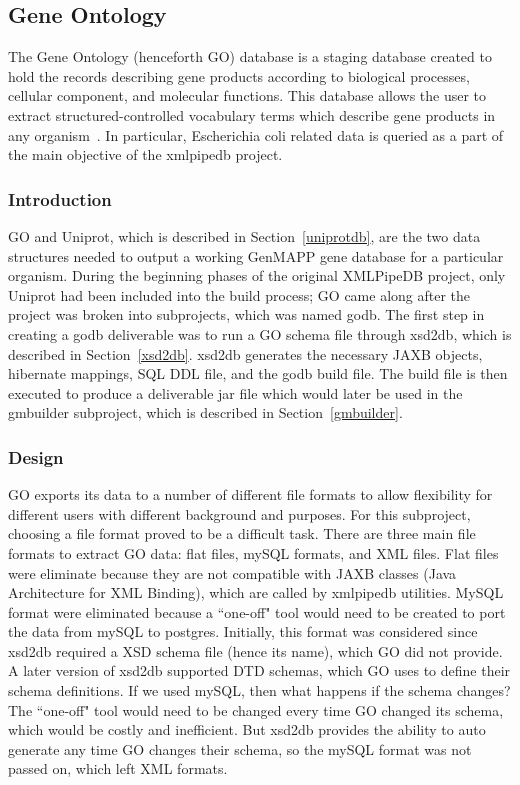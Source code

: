 %

 
\subsection{Gene Ontology}
The Gene Ontology (henceforth GO) database is a staging database created to hold the records describing gene products according to biological processes,
cellular component, and molecular functions. This database allows the user to extract structured-controlled vocabulary terms
which describe gene products in any organism~\cite{geneontologyWeb}. In particular, Escherichia coli related data is queried as a part of the main
objective of the xmlpipedb project.

\subsubsection{Introduction}
GO and Uniprot, which is described in Section~\ref{uniprotdb}, are the two data structures needed to output a
working GenMAPP gene database for a particular organism. During the beginning phases of the original XMLPipeDB project,
only Uniprot had been included into the build process; GO came along after the project was broken into subprojects,
which was named godb. The first step in creating a godb deliverable was to run a GO schema file
through xsd2db, which is described in Section~\ref{xsd2db}. xsd2db generates the necessary JAXB
objects, hibernate mappings, SQL DDL file, and the godb build file. The build file is then executed
to produce a deliverable jar file which  would later be used in the gmbuilder
subproject, which is described in Section~\ref{gmbuilder}.


\subsubsection{Design}
\label{godtd}
GO exports its data to a number of different file formats to allow flexibility for different users with
different background and purposes. For this subproject, choosing a file format proved to be a difficult task.
There are three main file formats to extract GO data: flat files, mySQL formats, and XML files. Flat files
were eliminate because they are not compatible with JAXB classes (Java Architecture for XML Binding), which  are called by
xmlpipedb utilities. MySQL format were eliminated because a ``one-off" tool would need
to be created to port the data from mySQL to postgres. Initially, this format was considered since xsd2db
required a XSD
schema file (hence its name), which GO did not provide. A later version of xsd2db supported DTD schemas, which GO uses to define their
schema definitions. If we used mySQL, then what happens if the schema changes? The ``one-off" tool would need to be changed every
time GO changed its schema, which would be costly and inefficient. But xsd2db provides the ability to auto generate any time GO changes
their schema, so the mySQL format was not passed on, which left XML formats.

